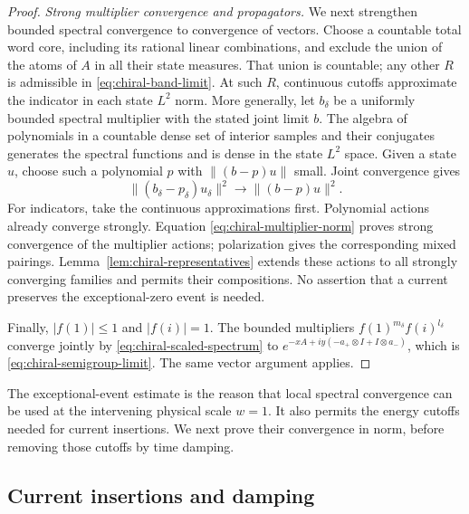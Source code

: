 \begin{proof}
\smallskip\noindent
\emph{Strong multiplier convergence and propagators.}
We next strengthen bounded spectral convergence to convergence of vectors.
Choose a countable total word core, including its rational linear
combinations, and exclude the union of the atoms of $A$ in all their state
measures. That union is countable; any other $R$ is admissible in
\eqref{eq:chiral-band-limit}. At such $R$, continuous cutoffs approximate
the indicator in each state $L^2$ norm. More generally, let $b_\delta$ be
a uniformly bounded spectral multiplier with the stated joint limit $b$.
The algebra of polynomials in a countable dense set of interior samples
and their conjugates generates the spectral functions and is dense in
the state $L^2$ space. Given a state $u$, choose such a polynomial $p$ with
$\|(b-p)u\|$ small. Joint convergence gives
\begin{equation}\label{eq:chiral-multiplier-norm}
 \|(b_\delta-p_\delta)u_\delta\|^2
          \longrightarrow\|(b-p)u\|^2.
\end{equation}
For indicators, take the continuous approximations first. Polynomial
actions already converge strongly. Equation
\eqref{eq:chiral-multiplier-norm} proves strong convergence of the
multiplier actions; polarization gives the corresponding mixed pairings.
Lemma~\ref{lem:chiral-representatives} extends these actions to all
strongly converging families and permits their compositions. No assertion
that a current preserves the exceptional-zero event is needed.

Finally, $|f(1)|\le1$ and $|f(i)|=1$. The bounded multipliers
$f(1)^{m_\delta}f(i)^{l_\delta}$ converge jointly by
\eqref{eq:chiral-scaled-spectrum} to
$e^{-xA+iy(-a_+\otimes I+I\otimes a_-)}$, which is
\eqref{eq:chiral-semigroup-limit}. The same vector argument applies.
\end{proof}

The exceptional-event estimate is the reason that local spectral convergence
can be used at the intervening physical scale $w=1$. It also permits the
energy cutoffs needed for current insertions. We next prove their convergence
in norm, before removing those cutoffs by time damping.

\subsection{Current insertions and damping}

